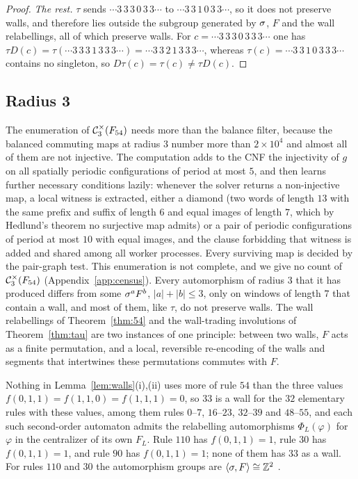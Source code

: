 \begin{proof}
\emph{The rest.} $\tau$ sends $\cdots3\,3\,3\,0\,3\,3\cdots$ to $\cdots3\,3\,1\,0\,3\,3\cdots$, so it does not preserve walls, and therefore lies outside the subgroup generated by $\sigma$, $F$ and the wall relabellings, all of which preserve walls. For $c=\cdots3\,3\,3\,0\,3\,3\,3\cdots$ one has $\tau D(c)=\tau(\cdots3\,3\,3\,1\,3\,3\,3\cdots)=\cdots3\,3\,2\,1\,3\,3\,3\cdots$, whereas $\tau(c)=\cdots3\,3\,1\,0\,3\,3\,3\cdots$ contains no singleton, so $D\tau(c)=\tau(c)\ne\tau D(c)$.
\end{proof}


\subsection{Radius 3}\label{sec:54r3}

The enumeration of $\mathcal{C}^{\times}_3(F_{54})$ needs more than the balance filter, because the balanced commuting maps at radius $3$ number more than $2\times10^4$ and almost all of them are not injective. The computation adds to the CNF the injectivity of $g$ on all spatially periodic configurations of period at most $5$, and then learns further necessary conditions lazily: whenever the solver returns a non-injective map, a local witness is extracted, either a diamond (two words of length $13$ with the same prefix and suffix of length $6$ and equal images of length $7$, which by Hedlund's theorem no surjective map admits) or a pair of periodic configurations of period at most $10$ with equal images, and the clause forbidding that witness is added and shared among all worker processes. Every surviving map is decided by the pair-graph test. This enumeration is not complete, and we give no count of $\mathcal{C}^{\times}_3(F_{54})$ (Appendix~\ref{app:census}). Every automorphism of radius $3$ that it has produced differs from some $\sigma^aF^b$, $|a|+|b|\le3$, only on windows of length $7$ that contain a wall, and most of them, like $\tau$, do not preserve walls. The wall relabellings of Theorem~\ref{thm:54} and the wall-trading involutions of Theorem~\ref{thm:tau} are two instances of one principle: between two walls, $F$ acts as a finite permutation, and a local, reversible re-encoding of the walls and segments that intertwines these permutations commutes with $F$.

\begin{remark}
Nothing in Lemma~\ref{lem:walls}(i),(ii) uses more of rule $54$ than the three values $f(0,1,1)=f(1,1,0)=f(1,1,1)=0$, so $33$ is a wall for the $32$ elementary rules with these values, among them rules $0$--$7$, $16$--$23$, $32$--$39$ and $48$--$55$, and each such second-order automaton admits the relabelling automorphisms $\Phi_L(\varphi)$ for $\varphi$ in the centralizer of its own $F_L$. Rule $110$ has $f(0,1,1)=1$, rule $30$ has $f(0,1,1)=1$, and rule $90$ has $f(0,1,1)=1$; none of them has $33$ as a wall. For rules $110$ and $30$ the automorphism groups are $\langle\sigma,F\rangle\cong\mathbb{Z}^2$ \cite{PaperA,PaperB}.
\end{remark}

